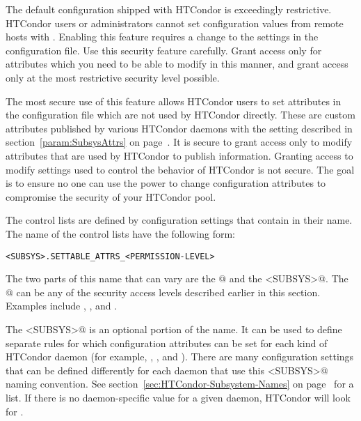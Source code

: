 The default configuration shipped with HTCondor is exceedingly
restrictive.
HTCondor users or administrators cannot set
configuration values from remote hosts with .
Enabling this feature requires a change to the
settings in the configuration file.
Use this security feature carefully.
Grant access only for attributes which you need to be able to modify
in this manner, and grant access only at the most restrictive
security level possible.

The most secure use of this feature allows HTCondor users to set
attributes in the configuration file which are not used by HTCondor
directly.
These are custom attributes published by various HTCondor
daemons with the  setting described in
section~\ref{param:SubsysAttrs} on page~\pageref{param:SubsysAttrs}.
It is secure to grant access only to modify attributes that are used by HTCondor
to publish information.
Granting access to modify
settings used to control the behavior of HTCondor is
not secure.
The goal is to
ensure no
one can use the power to change configuration attributes to compromise 
the security of your HTCondor pool.

The control lists are defined by configuration settings that contain 
 in their name.
The name of the control lists have the following form: 

\footnotesize
\begin{verbatim}
<SUBSYS>.SETTABLE_ATTRS_<PERMISSION-LEVEL>
\end{verbatim}
\normalsize

The two parts of this name that can vary are
the @ and the \verb@<SUBSYS>@.
The @ can be any of the security access levels
described earlier in this section.
Examples include , , and .

The \verb@<SUBSYS>@ is an optional portion of the name. 
It can be used to
define separate rules for which configuration attributes can be set
for each kind of HTCondor daemon (for example, 
, , and ).
There are many configuration settings that can be defined differently
for each daemon that use this \verb@<SUBSYS>@ naming convention.
See section~\ref{sec:HTCondor-Subsystem-Names} on
page~\pageref{sec:HTCondor-Subsystem-Names} for a list.
If there is no daemon-specific value for a given daemon, HTCondor will
look for .

